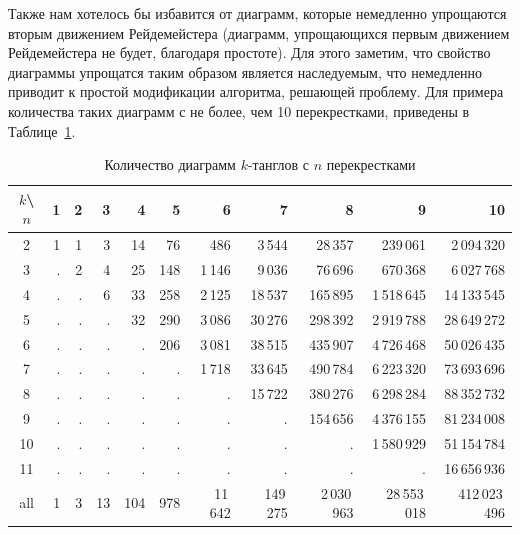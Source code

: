 \documentclass[12pt]{article}
\theoremstyle{plain}
\theoremstyle{definition}
\begin{document}
		Также нам хотелось бы избавится от диаграмм, которые немедленно упрощаются вторым движением Рейдемейстера (диаграмм, упрощающихся
		первым движением Рейдемейстера не будет, благодаря простоте). Для этого заметим, что свойство диаграммы упрощатся таким образом
		является наследуемым, что немедленно приводит к простой модификации алгоритма, решающей проблему. Для примера количества таких
		диаграмм с не более, чем 10 перекрестками, приведены в Таблице~\ref{table:tangle-diagrams}.

		\begin{table}[ht]
			\caption{Количество диаграмм $k$-танглов с $n$ перекрестками\label{table:tangle-diagrams}}
			\centering
			\begin{tabular}{|c||r|r|r|r|r|r|r|r|r|r|}
			\hline
			$k$\textbackslash $n$
			    & 1 & 2 &  3 &   4 &   5 &       6 &        7 &           8 &            9 &            10 \\
			\hline\hline
			2   & 1 & 1 &  3 &  14 &  76 &     486 &   3\,544 &     28\,357 &     239\,061 &   2\,094\,320 \\
			3   & . & 2 &  4 &  25 & 148 &  1\,146 &   9\,036 &     76\,696 &     670\,368 &   6\,027\,768 \\
			4   & . & . &  6 &  33 & 258 &  2\,125 &  18\,537 &    165\,895 &  1\,518\,645 &  14\,133\,545 \\
			5   & . & . &  . &  32 & 290 &  3\,086 &  30\,276 &    298\,392 &  2\,919\,788 &  28\,649\,272 \\
			6   & . & . &  . &   . & 206 &  3\,081 &  38\,515 &    435\,907 &  4\,726\,468 &  50\,026\,435 \\
			7   & . & . &  . &   . &   . &  1\,718 &  33\,645 &    490\,784 &  6\,223\,320 &  73\,693\,696 \\
			8   & . & . &  . &   . &   . &       . &  15\,722 &    380\,276 &  6\,298\,284 &  88\,352\,732 \\
			9   & . & . &  . &   . &   . &       . &        . &    154\,656 &  4\,376\,155 &  81\,234\,008 \\
			10  & . & . &  . &   . &   . &       . &        . &           . &  1\,580\,929 &  51\,154\,784 \\
			11  & . & . &  . &   . &   . &       . &        . &           . &            . &  16\,656\,936 \\
			\hline
			all & 1 & 3 & 13 & 104 & 978 & 11\,642 & 149\,275 & 2\,030\,963 & 28\,553\,018 & 412\,023\,496 \\
			\hline
			\end{tabular}
		\end{table}
\end{document}
